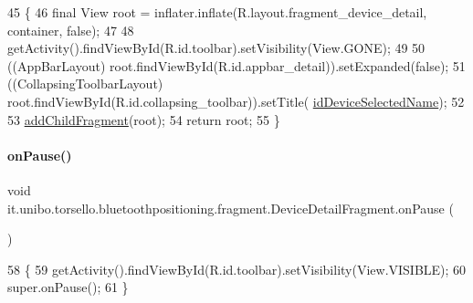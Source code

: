 \begin{DoxyCode}
45                                                                                                       \{
46         \textcolor{keyword}{final} View root = inflater.inflate(R.layout.fragment\_device\_detail, container, \textcolor{keyword}{false});
47 
48         getActivity().findViewById(R.id.toolbar).setVisibility(View.GONE);
49 
50         ((AppBarLayout) root.findViewById(R.id.appbar\_detail)).setExpanded(\textcolor{keyword}{false});
51         ((CollapsingToolbarLayout) root.findViewById(R.id.collapsing\_toolbar)).setTitle(
      \hyperlink{classit_1_1unibo_1_1torsello_1_1bluetoothpositioning_1_1fragment_1_1DeviceDetailFragment_a6d52d8371a07fb8da75879758d1d6942_a6d52d8371a07fb8da75879758d1d6942}{idDeviceSelectedName});
52 
53         \hyperlink{classit_1_1unibo_1_1torsello_1_1bluetoothpositioning_1_1fragment_1_1DeviceDetailFragment_a62c541b8382a522f06a5d9c56cf50b26_a62c541b8382a522f06a5d9c56cf50b26}{addChildFragment}(root);
54         \textcolor{keywordflow}{return} root;
55     \}
\end{DoxyCode}
\hypertarget{classit_1_1unibo_1_1torsello_1_1bluetoothpositioning_1_1fragment_1_1DeviceDetailFragment_a1ed4762356dd3067ce48aa73da50404e_a1ed4762356dd3067ce48aa73da50404e}{}\label{classit_1_1unibo_1_1torsello_1_1bluetoothpositioning_1_1fragment_1_1DeviceDetailFragment_a1ed4762356dd3067ce48aa73da50404e_a1ed4762356dd3067ce48aa73da50404e} 
\paragraph{\texorpdfstring{on\+Pause()}{onPause()}}
{\footnotesize\ttfamily void it.\+unibo.\+torsello.\+bluetoothpositioning.\+fragment.\+Device\+Detail\+Fragment.\+on\+Pause (\begin{DoxyParamCaption}{ }\end{DoxyParamCaption})}


\begin{DoxyCode}
58                           \{
59         getActivity().findViewById(R.id.toolbar).setVisibility(View.VISIBLE);
60         super.onPause();
61     \}
\end{DoxyCode}



